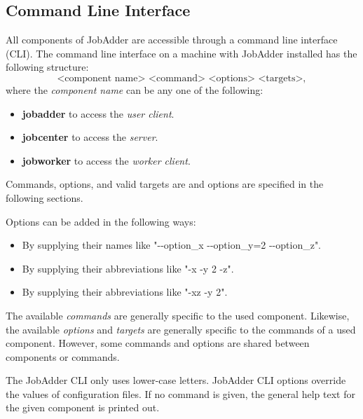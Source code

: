 \newcommand{\jacommand}[3]{

\textsc{\large{\textbf{#1}}}
\begin{itemize}
\item[\textbf{Options:}] #2
\item[\textbf{Effect:}] #3
\end{itemize}
}
\newcommand{\jaoption}[3]{
\begin{itemize}
\item[] \textbf{#1} (#2)
\item[\textbf{Effect:}] #3
\end{itemize}
}
\subsection{Command Line Interface}
All components of JobAdder are accessible through a command line interface (CLI).
The command line interface on a machine with JobAdder installed has the following structure:
\begin{equation}
\text{<component name> <command> <options> <targets>},
\end{equation}
where the \textit{component name} can be any one of the following:
\begin{itemize}
\item \textbf{jobadder} to access the \textit{user client}.
\item \textbf{jobcenter} to access the \textit{server}.
\item \textbf{jobworker} to access the \textit{worker client}.
\end{itemize}
Commands, options, and valid targets are and options are specified in the following sections.

Options can be added in the following ways:
\begin{itemize}
\item By supplying their names like "-{}-option\_x -{}-option\_y=2 -{}-option\_z".
\item By supplying their abbreviations like "-x -y 2 -z".
\item By supplying their abbreviations like "-xz -y 2".
\end{itemize}

The available \textit{commands} are generally specific to the used component.
Likewise, the available \textit{options} and \textit{targets} are generally specific to the commands of a used component.
However, some commands and options are shared between components or commands.

The JobAdder CLI only uses lower-case letters.
JobAdder CLI options override the values of configuration files.
If no command is given, the general help text for the given component is printed out.
